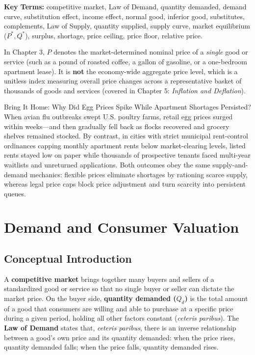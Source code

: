 \documentclass[11pt,letterpaper]{article}
\begin{document}
\noindent\textbf{Key Terms:} competitive market, Law of Demand, quantity demanded, demand curve, substitution effect, income effect, normal good, inferior good, substitutes, complements, Law of Supply, quantity supplied, supply curve, market equilibrium ($P^*, Q^*$), surplus, shortage, price ceiling, price floor, relative price.

\begin{coreprinciple}
In Chapter 3, $P$ denotes the market-determined nominal price of a \emph{single} good or service (such as a pound of roasted coffee, a gallon of gasoline, or a one-bedroom apartment lease). It is \textbf{not} the economy-wide aggregate price level, which is a unitless index measuring overall price changes across a representative basket of thousands of goods and services (covered in Chapter 5: \emph{Inflation and Deflation}).
\end{coreprinciple}

\begin{examplecase}{Bring It Home: Why Did Egg Prices Spike While Apartment Shortages Persisted?}
When avian flu outbreaks swept U.S. poultry farms, retail egg prices surged within weeks—and then gradually fell back as flocks recovered and grocery shelves remained stocked. By contrast, in cities with strict municipal rent-control ordinances capping monthly apartment rents below market-clearing levels, listed rents stayed low on paper while thousands of prospective tenants faced multi-year waitlists and unreturned applications. Both outcomes obey the same supply-and-demand mechanics: flexible prices eliminate shortages by rationing scarce supply, whereas legal price caps block price adjustment and turn scarcity into persistent queues.
\end{examplecase}

\section{Demand and Consumer Valuation}

\subsection*{Conceptual Introduction}
A \textbf{competitive market} brings together many buyers and sellers of a standardized good or service so that no single buyer or seller can dictate the market price. On the buyer side, \textbf{quantity demanded ($Q_d$)} is the total amount of a good that consumers are willing and able to purchase at a specific price during a given period, holding all other factors constant (\emph{ceteris paribus}). The \textbf{Law of Demand} states that, \emph{ceteris paribus}, there is an inverse relationship between a good's own price and its quantity demanded: when the price rises, quantity demanded falls; when the price falls, quantity demanded rises.
\end{document}
